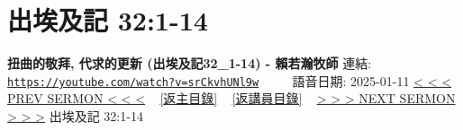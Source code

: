 \documentclass{book}
\begin{document}
\section{出埃及記 32:1-14}
\label{sec:srCkvhUNl9w}
\textbf{扭曲的敬拜, 代求的更新 (出埃及記32\_1-14) -  賴若瀚牧師}
\newline
\newline
連結: \href{https://youtube.com/watch?v=srCkvhUNl9w}{\texttt{https://youtube.com/watch?v=srCkvhUNl9w}} ~~~~ 語音日期: 2025-01-11
\newline
\newline
\hyperref[sec:yRzXvTTOZfM]{< < < PREV SERMON < < <}
~
\hyperlink{toc}{[返主目錄]}
~
\hyperref[ch:preacher14]{[返講員目錄]}
~
\hyperref[sec:4994BMikpLI]{> > > NEXT SERMON > > >}
\newline
\newline
出埃及記 32:1-14
\newline
\end{document}
